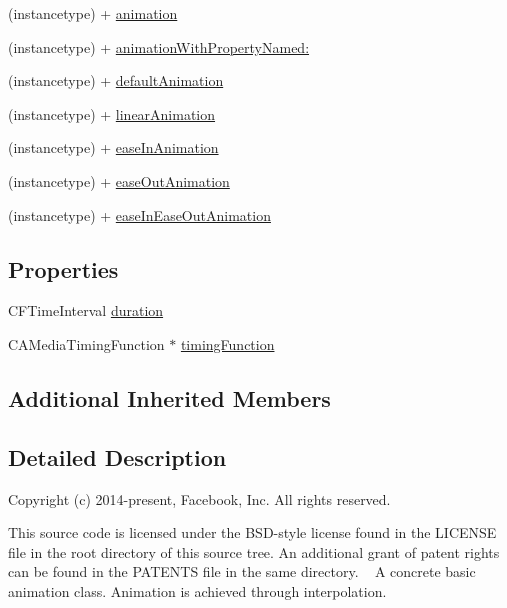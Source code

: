 \begin{DoxyCompactItemize}
\item 
(instancetype) + \mbox{\hyperlink{interface_p_o_p_basic_animation_ae6cb5087195e47aa4fd9f615829cce4c}{animation}}
\item 
(instancetype) + \mbox{\hyperlink{interface_p_o_p_basic_animation_aa6332608f15c63f9ca6837fd595a2032}{animation\+With\+Property\+Named\+:}}
\item 
(instancetype) + \mbox{\hyperlink{interface_p_o_p_basic_animation_a93bf55b391828d3e76031be39bcdbd1f}{default\+Animation}}
\item 
(instancetype) + \mbox{\hyperlink{interface_p_o_p_basic_animation_a67906e9230c1e8a01d052d86445c9d1e}{linear\+Animation}}
\item 
(instancetype) + \mbox{\hyperlink{interface_p_o_p_basic_animation_a19baa1e60760e093db39511258f2a4fe}{ease\+In\+Animation}}
\item 
(instancetype) + \mbox{\hyperlink{interface_p_o_p_basic_animation_acc9d80c152ce8a12051fb83487bed541}{ease\+Out\+Animation}}
\item 
(instancetype) + \mbox{\hyperlink{interface_p_o_p_basic_animation_a13f8eb84a553d3c366fac03fd5b71adb}{ease\+In\+Ease\+Out\+Animation}}
\end{DoxyCompactItemize}
\subsection*{Properties}
\begin{DoxyCompactItemize}
\item 
C\+F\+Time\+Interval \mbox{\hyperlink{interface_p_o_p_basic_animation_a50edea713d4d915a925b19095dba0f7d}{duration}}
\item 
C\+A\+Media\+Timing\+Function $\ast$ \mbox{\hyperlink{interface_p_o_p_basic_animation_a8cb9cd6eacafdebd129d93ee7b687b20}{timing\+Function}}
\end{DoxyCompactItemize}
\subsection*{Additional Inherited Members}


\subsection{Detailed Description}
Copyright (c) 2014-\/present, Facebook, Inc. All rights reserved.

This source code is licensed under the B\+S\+D-\/style license found in the L\+I\+C\+E\+N\+SE file in the root directory of this source tree. An additional grant of patent rights can be found in the P\+A\+T\+E\+N\+TS file in the same directory. ~\newline
 A concrete basic animation class.  Animation is achieved through interpolation.


